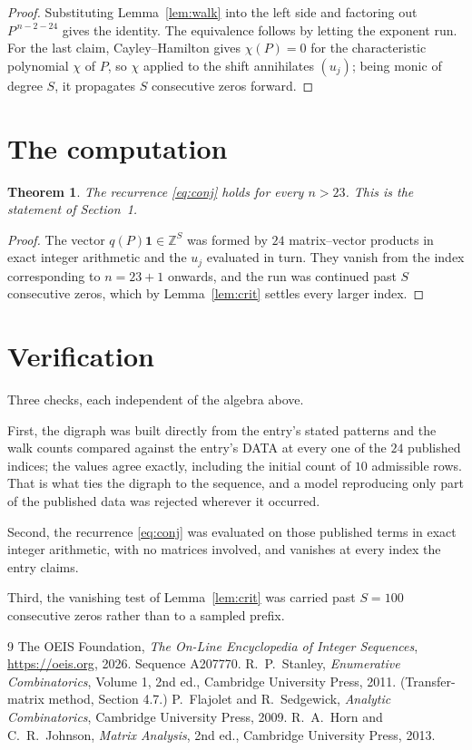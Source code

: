 \documentclass[11pt,a4paper]{article}
\theoremstyle{plain}
\newtheorem{theorem}{Theorem}
\theoremstyle{definition}
\begin{document}
\begin{proof}
Substituting Lemma~\ref{lem:walk} into the left side and factoring out
$P^{\,n-2-24}$ gives the identity. The equivalence follows by letting the exponent
run. For the last claim, Cayley--Hamilton gives $\chi(P)=0$ for the characteristic
polynomial $\chi$ of $P$, so $\chi$ applied to the shift annihilates $(u_j)$; being monic of
degree $S$, it propagates $S$ consecutive zeros forward.
\end{proof}

\section{The computation}

\begin{theorem}
The recurrence \eqref{eq:conj} holds for every $n>23$. This is the statement of
Section~1.
\end{theorem}

\begin{proof}
The vector $q(P)\mathbf{1}\in\mathbb{Z}^{S}$ was formed by $24$ matrix--vector
products in exact integer arithmetic and the $u_j$ evaluated in turn. They vanish from the
index corresponding to $n=23+1$ onwards, and the run was continued past $S$ consecutive
zeros, which by Lemma~\ref{lem:crit} settles every larger index.
\end{proof}

\section{Verification}

Three checks, each independent of the algebra above.

First, the digraph was built directly from the entry's stated patterns and the walk counts
compared against the entry's DATA at every one of the $24$ published indices; the
values agree exactly, including the initial count of $10$ admissible rows. That is
what ties the digraph to the sequence, and a model reproducing only part of the published
data was rejected wherever it occurred.

Second, the recurrence \eqref{eq:conj} was evaluated on those published terms in exact
integer arithmetic, with no matrices involved, and vanishes at every index the entry claims.

Third, the vanishing test of Lemma~\ref{lem:crit} was carried past $S=100$ consecutive
zeros rather than to a sampled prefix.

\begin{thebibliography}{9}
 The OEIS Foundation, \emph{The On-Line Encyclopedia of Integer
Sequences}, \url{https://oeis.org}, 2026. Sequence A207770.
 R.~P.~Stanley, \emph{Enumerative Combinatorics}, Volume 1, 2nd ed.,
Cambridge University Press, 2011. (Transfer-matrix method, Section 4.7.)
 P.~Flajolet and R.~Sedgewick, \emph{Analytic Combinatorics}, Cambridge
University Press, 2009.
 R.~A.~Horn and C.~R.~Johnson, \emph{Matrix Analysis}, 2nd ed., Cambridge
University Press, 2013.
\end{thebibliography}
\end{document}
